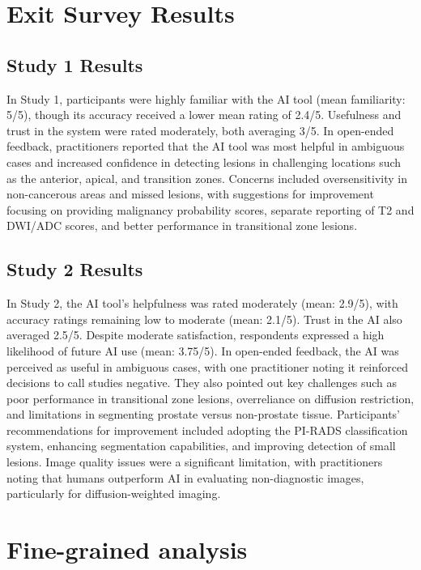 \section{Exit Survey Results}

\subsection*{Study 1 Results}
In Study 1, participants were highly familiar with the AI tool (mean familiarity: 5/5), though its accuracy received a lower mean rating of 2.4/5. Usefulness and trust in the system were rated moderately, both averaging 3/5. 
In open-ended feedback, practitioners reported that the AI tool was most helpful in ambiguous cases and increased confidence in detecting lesions in challenging locations such as the anterior, apical, and transition zones. Concerns included oversensitivity in non-cancerous areas and missed lesions, with suggestions for improvement focusing on providing malignancy probability scores, separate reporting of T2 and DWI/ADC scores, and better performance in transitional zone lesions.

\subsection*{Study 2 Results}
In Study 2, the AI tool's helpfulness was rated moderately (mean: 2.9/5), with accuracy ratings remaining low to moderate (mean: 2.1/5). Trust in the AI also averaged 2.5/5. Despite moderate satisfaction, respondents expressed a high likelihood of future AI use (mean: 3.75/5). In open-ended feedback, the AI was perceived as useful in ambiguous cases, with one practitioner noting it reinforced decisions to call studies negative. 
They also pointed out key challenges such as poor performance in transitional zone lesions, overreliance on diffusion restriction, and limitations in segmenting prostate versus non-prostate tissue. Participants' recommendations for improvement included adopting the PI-RADS classification system, enhancing segmentation capabilities, and improving detection of small lesions. Image quality issues were a significant limitation, with practitioners noting that humans outperform AI in evaluating non-diagnostic images, particularly for diffusion-weighted imaging.




\section{Fine-grained analysis}
\label{app:fine_grained}

